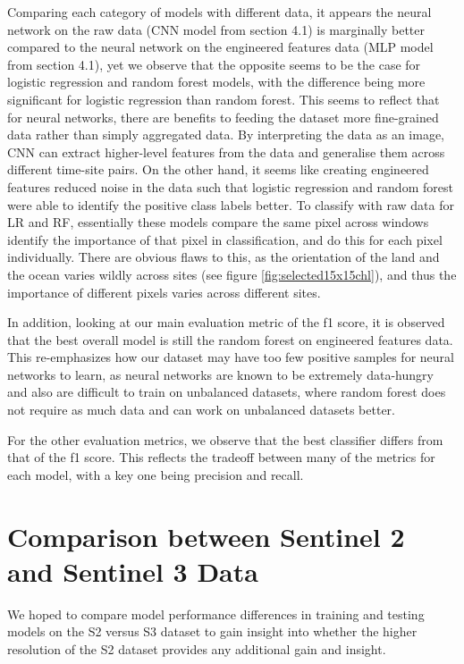 \documentclass[a4paper,11pt]{report}
\begin{document}
Comparing each category of models with different data, it appears the neural network on the raw data (CNN model from section 4.1) is marginally better compared to the neural network on the engineered features data (MLP model from section 4.1), yet we observe that the opposite seems to be the case for logistic regression and random forest models, with the difference being more significant for logistic regression than random forest. This seems to reflect that for neural networks, there are benefits to feeding the dataset more fine-grained data rather than simply aggregated data. By interpreting the data as an image, CNN can extract higher-level features from the data and generalise them across different time-site pairs. On the other hand, it seems like creating engineered features reduced noise in the data such that logistic regression and random forest were able to identify the positive class labels better. To classify with raw data for LR and RF, essentially these models compare the same pixel across windows identify the importance of that pixel in classification, and do this for each pixel individually. There are obvious flaws to this, as the orientation of the land and the ocean varies wildly across sites (see figure \ref{fig:selected15x15chl}), and thus the importance of different pixels varies across different sites. 

In addition, looking at our main evaluation metric of the f1 score, it is observed that the best overall model is still the random forest on engineered features data. This re-emphasizes how our dataset may have too few positive samples for neural networks to learn, as neural networks are known to be extremely data-hungry and also are difficult to train on unbalanced datasets, where random forest does not require as much data and can work on unbalanced datasets better.

For the other evaluation metrics, we observe that the best classifier differs from that of the f1 score. This reflects the tradeoff between many of the metrics for each model, with a key one being precision and recall. 

\section{Comparison between Sentinel 2 and Sentinel 3 Data}
\label{sec:Comparison between Sentinel 2 and Sentinel 3 Data}

We hoped to compare model performance differences in training and testing models on the S2 versus S3 dataset to gain insight into whether the higher resolution of the S2 dataset provides any additional gain and insight. 
\end{document}
